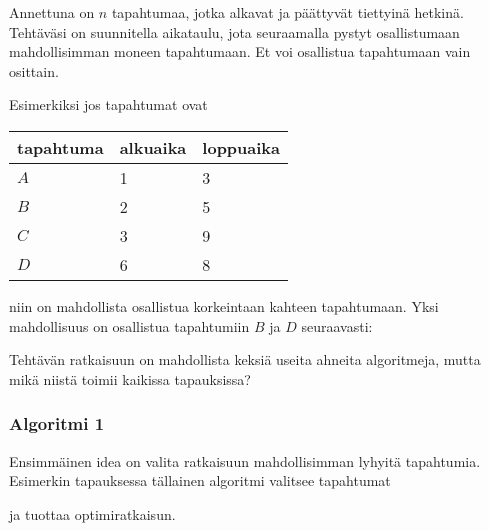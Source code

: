 \begin{task}
Annettuna on $n$ tapahtumaa,
jotka alkavat ja päättyvät tiettyinä hetkinä.
Tehtäväsi on suunnitella aikataulu,
jota seuraamalla pystyt osallistumaan
mahdollisimman moneen tapahtumaan.
Et voi osallistua tapahtumaan vain osittain.
\end{task}

Esimerkiksi jos tapahtumat ovat
\begin{center}
\begin{tabular}{lll}
tapahtuma & alkuaika & loppuaika \\
\hline
$A$ & 1 & 3 \\
$B$ & 2 & 5 \\
$C$ & 3 & 9 \\
$D$ & 6 & 8 \\
\end{tabular}
\end{center}
niin on mahdollista osallistua korkeintaan
kahteen tapahtumaan.
Yksi mahdollisuus on osallistua tapahtumiin
$B$ ja $D$ seuraavasti:
\begin{center}
\end{center}

Tehtävän ratkaisuun on mahdollista 
keksiä useita ahneita algoritmeja,
mutta mikä niistä toimii kaikissa tapauksissa?

\subsubsection*{Algoritmi 1}

Ensimmäinen idea on valita ratkaisuun
mahdollisimman lyhyitä tapahtumia.
Esimerkin tapauksessa tällainen
algoritmi valitsee tapahtumat
\\
\begin{center}
\end{center}
ja tuottaa optimiratkaisun.


